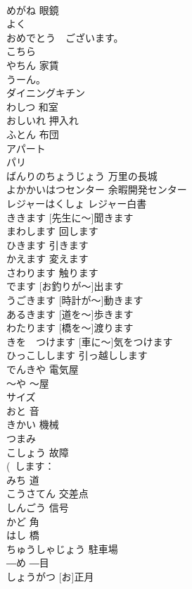 \documentclass[8pt]{extreport}
\begin{document}
\begin{CJK}{UTF8}{min}
\\	めがね	眼鏡	
\\	よく			
\\	おめでとう　ございます。			
\\	こちら			
\\	やちん	家賃	
\\	うーん。			
\\	ダイニングキチン			
\\	わしつ	和室	
\\	おしいれ	押入れ	
\\	ふとん	布団	
\\	アパート			
\\	パリ			
\\	ばんりのちょうじょう	万里の長城	
\\	よかかいはつセンター	余暇開発センター	
\\	レジャーはくしょ	レジャー白書	
\\	[せんせいに～]ききます	[先生に～]聞きます	
\\	まわします	回します	
\\	ひきます	引きます	
\\	かえます	変えます	
\\	[ドアに～]さわります	触ります	
\\	[おつりが～]でます	[お釣りが～]出ます	
\\	[とけいが～] うごきます	[時計が～]動きます	
\\	[みちを～]あるきます	[道を～]歩きます	
\\	[はしを～]わたります	[橋を～]渡ります	
\\	[くるまに～]きを　つけます	[車に～]気をつけます	
\\	ひっこしします	引っ越しします	
\\	でんきや	電気屋	
\\	～や	～屋	
\\	サイズ			
\\	おと	音	
\\	きかい	機械	
\\	つまみ			
\\	こしょう	故障	
\\	(~します：
\\	みち	道	
\\	こうさてん	交差点	
\\	しんごう	信号	
\\	かど	角	
\\	はし	橋	
\\	ちゅうしゃじょう	駐車場	
\\	―め	―目	
\\	[お]しょうがつ	[お]正月	

\end{CJK}
\end{document}
